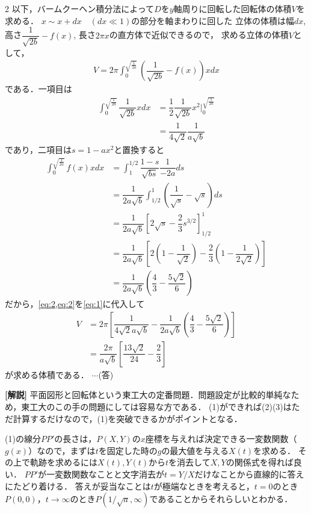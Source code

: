 \documentclass[../../main.tex]{subfiles}
\begin{document}
\begin{multicols}{2}
  以下，バームクーヘン積分法によって$D$を$y$軸周りに回転した回転体の体積$V$を求める．
  $x \sim x+dx \quad (dx \ll 1)$の部分を軸まわりに回した
  立体の体積は幅$dx$, 高さ$\dfrac{1}{\sqrt{2b}}-f(x)$, 長さ$2\pi x$の直方体で近似できるので，
  求める立体の体積$V$として，
  \begin{align}
    V = 2\pi \int_{0}^{\sqrt{\frac{1}{2a}}} \left(\dfrac{1}{\sqrt{2b}} - f(x)\right)x dx \label{eq:1}
  \end{align}
  である．一項目は
  \begin{align}
    \int_{0}^{\sqrt{\frac{1}{2a}}} \dfrac{1}{\sqrt{2b}} x dx
    & = \dfrac{1}{2} \dfrac{1}{\sqrt{2b}} x^2 \Big|_{0}^{\sqrt{\frac{1}{2a}}} \nonumber \\
    & = \dfrac{1}{4\sqrt{2}} \dfrac{1}{a\sqrt{b}} \label{eq:2}
  \end{align}
  であり，二項目は$s=1-ax^2$と置換すると
  \begin{align}
    \int_{0}^{\sqrt{\frac{1}{2a}}} f(x)x dx
    & = \int_{1}^{1/2} \dfrac{1-s}{\sqrt{bs}} \dfrac{1}{-2a} ds                        \nonumber       \\
    & = \dfrac{1}{2a\sqrt{b}} \int_{1/2}^{1} \left(\dfrac{1}{\sqrt{s}} - \sqrt{s}\right) ds  \nonumber \\
    & = \dfrac{1}{2a\sqrt{b}} \left[2\sqrt{s} - \dfrac{2}{3} s^{3/2}\right]_{1/2}^{1}     \nonumber    \\
    & = \dfrac{1}{2a\sqrt{b}} \left[2\left(1-\dfrac{1}{\sqrt{2}}\right) -
    \dfrac{2}{3}\left(1-\dfrac{1}{2\sqrt{2}}\right)\right]                               \nonumber      \\
    & = \dfrac{1}{2a\sqrt{b}} \left(\dfrac{4}{3} - \dfrac{5\sqrt{2}}{6}\right) \label{eq:3}
  \end{align}
  だから，\cref{eq:2,eq:2}を\cref{eq:1}に代入して
  \begin{align}
    V & = 2\pi \left[ \dfrac{1}{4\sqrt{2}a\sqrt{b}}  - \dfrac{1}{2a\sqrt{b}} \left(\dfrac{4}{3} - \dfrac{5\sqrt{2}}{6}\right) \right] \\
    & = \dfrac{2\pi}{a\sqrt{b}} \left[ \dfrac{13\sqrt{2}}{24} - \dfrac{2}{3} \right]
  \end{align}
  が求める体積である．  $\cdots$(答)

  {\bf [解説]}
  平面図形と回転体という東工大の定番問題．問題設定が比較的単純なため，東工大のこの手の問題にしては容易な方である．
  (1)ができれば(2)(3)はただ計算するだけなので，(1)を突破できるかがポイントとなる．

  (1)の線分$PP'$の長さは，$P(X,Y)$の$x$座標を与えれば決定できる一変数関数（$g(x)$）なので，まずは$t$を固定した時の$g$の最大値を与える$X(t)$を求める．
  その上で軌跡を求めるには$X(t),Y(t)$から$t$を消去して$X,Y$の関係式を得れば良い．
  $PP'$が一変数関数なことと文字消去が$t=Y/X$だけなことから直線的に答えにたどり着ける．
  答えが妥当なことは$t$が極端なときを考えると，$t=0$のとき$P(0,0)$，$t\to\infty$のとき$P(1/\sqrt{a},\infty)$であることからそれらしいとわかる．


\end{multicols}
\end{document}
